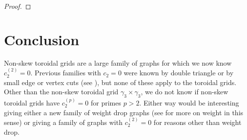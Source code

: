\documentclass[12pt]{amsart}
\numberwithin{definition}{section}
\begin{document}
\begin{proof}
  
\end{proof}

\section{Conclusion}
Non-skew toroidal grids are a large family of graphs for which we now know $c_2^{(2)}=0$.  Previous families with $c_2=0$ were known by double triangle or by small edge or vertex cuts (see \cite{BrownSchnetz2012, BrownSchnetzYeats2014}), but none of these apply to the toroidal grids. Other than the non-skew toroidal grid $\gamma_3\times \gamma_3$, we do not know if non-skew toroidal grids have $c_2^{(p)}=0$ for primes $p>2$.  Either way would be interesting giving either a new family of weight drop graphs (see \cite{BrownYeats2011} for more on weight in this sense) or giving a family of graphs with $c_2^{(2)}=0$ for reasons other than weight drop.
\end{document}
